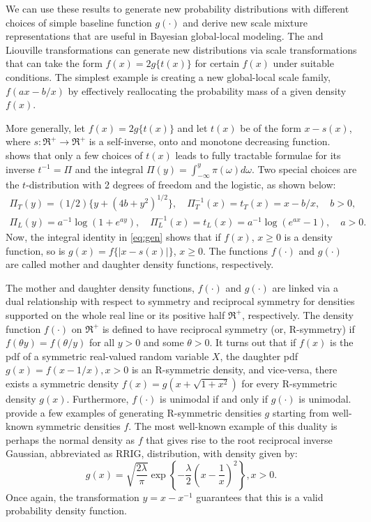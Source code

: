 \documentclass[bj]{imsart}
\begin{document}
We can use these results to generate new probability distributions with different choices of simple baseline function $g(\cdot)$ and derive new scale mixture representations that are useful in Bayesian global-local modeling. The \CS{} and Liouville transformations can generate new distributions via scale transformations that can take the form $f(x) = 2 g\{ t(x) \}$ for certain $f(x)$ under suitable conditions. The simplest example is creating a new global-local scale family, $f(a x - b/x)$ by effectively reallocating the probability mass of a given density $f(x)$. 

More generally, let $f(x) = 2g\{ t(x) \}$ and let $t(x)$ be of the form $x-s(x)$, where $s : \Re^+ \to \Re^+$ is a self-inverse, onto and monotone decreasing function.    \citet{jones_generating_2014} shows that only a few choices of $t(x)$ leads to fully tractable formulae for its inverse $t^{-1}= \Pi$ and the integral 
$\Pi(y) = \int_{-\infty}^{y} \pi(\omega) d\omega$. Two special choices are the $t$-distribution with 2 degrees of freedom and the logistic, as shown below:
\begin{align*}
\Pi_{T}(y) = (1/2)\{ y+(4b+y^2)^{1/2}\}, \quad \Pi_T^{-1}(x) = t_T(x) = x - b/x, \quad b >0,\\
\Pi_{L}(y) = a^{-1} \log(1+e^{ay}), \quad \Pi_L^{-1}(x) = t_L(x) = a^{-1} \log(e^{ax}-1), \quad a>0.
\end{align*}
Now, the integral identity in \eqref{eq:gen} shows that if $f(x)$, $x \geq 0$ is a density function, so is $g(x) = f\{\lvert x-s(x) \rvert\}$, $x \ge 0$.  The functions $f(\cdot)$ and $g(\cdot)$ are called mother and daughter density functions, respectively.  %

The mother and daughter density functions, $f(\cdot)$ and $g(\cdot)$ are linked via a dual relationship with respect to symmetry and reciprocal symmetry for densities supported on the whole real line or its positive half $\Re^{+}$, respectively. The density function $f(\cdot)$ on $\Re^{+}$ is defined to have reciprocal symmetry (or, R-symmetry) if $f(\theta y) = f(\theta / y)$ for all $y > 0$ and some $\theta >0$. It turns out that if $f(x)$ is the pdf of a symmetric real-valued random variable $X$, the daughter pdf $g(x) = f(x-1/x), x>0$ is an R-symmetric density, and vice-versa, there exists a symmetric density $f(x) = g(x+\sqrt{1+x^2})$ for
every R-symmetric density $g(x)$. Furthermore, $f(\cdot)$ is unimodal if and only if $g(\cdot)$ is unimodal. \cite{chaubey2010reciprocal} provide a few examples of generating R-symmetric densities $g$ starting from well-known symmetric densities $f$. The most well-known example of this duality is perhaps the normal density as $f$ that gives rise to the root reciprocal inverse Gaussian, abbreviated as RRIG, distribution, with density given by: 
\[
g(x) = \sqrt{\frac{2\lambda}{\pi}} \exp \left\{ - \frac{\lambda}{2} \left( x - \frac{1}{x} \right)^2 \right\}, x >0.  
\]
Once again, the \CS{} transformation $y = x - x^{-1}$ guarantees that this is a valid probability density function.
\end{document}
